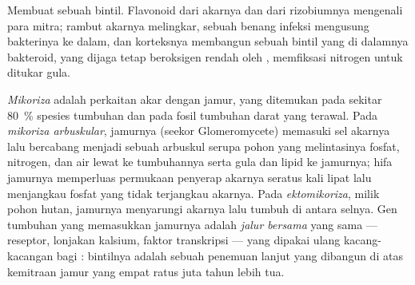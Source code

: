 \begin{omfigure}
{\small Membuat sebuah bintil. Flavonoid dari akarnya dan  dari
rizobiumnya mengenali para mitra; rambut akarnya melingkar, sebuah benang
infeksi mengusung bakterinya ke dalam, dan korteksnya membangun sebuah bintil
yang di dalamnya bakteroid, yang dijaga tetap beroksigen rendah oleh
, memfiksasi nitrogen untuk ditukar gula.}
\end{omfigure}

\begin{definition}[Mikoriza]\label{def:b3:microbiomes:mycorrhiza}
\emph{Mikoriza} adalah perkaitan akar dengan jamur, yang ditemukan pada sekitar
\qty{80}{\%} spesies tumbuhan dan pada fosil tumbuhan darat yang terawal.
Pada \emph{mikoriza arbuskular}, jamurnya (seekor Glomeromycete) memasuki
sel akarnya lalu bercabang menjadi sebuah arbuskul serupa pohon yang
melintasinya fosfat, nitrogen, dan air lewat ke tumbuhannya serta gula dan
lipid ke jamurnya; hifa jamurnya memperluas permukaan penyerap akarnya seratus
kali lipat lalu menjangkau fosfat yang tidak terjangkau akarnya. Pada
\emph{ektomikoriza}, milik pohon hutan, jamurnya menyarungi akarnya lalu
tumbuh di antara selnya. Gen tumbuhan yang memasukkan jamurnya adalah
\emph{jalur  bersama} yang sama --- reseptor, lonjakan kalsium,
faktor transkripsi --- yang dipakai ulang kacang-kacangan bagi :
bintilnya adalah sebuah penemuan lanjut yang dibangun di atas kemitraan jamur
yang empat ratus juta tahun lebih tua.
\end{definition}

